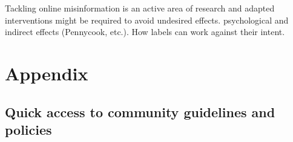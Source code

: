 \documentclass{article}
\begin{document}
\smallskip

{\color{brown} Tackling online misinformation is an active area of research and adapted interventions might be required to avoid undesired effects. 
psychological and indirect effects (Pennycook, etc.). 
How labels can work against their intent.}

\smallskip
	




{}


\section{Appendix}

\subsection{Quick access to community guidelines and policies} \label{links}
\end{document}
